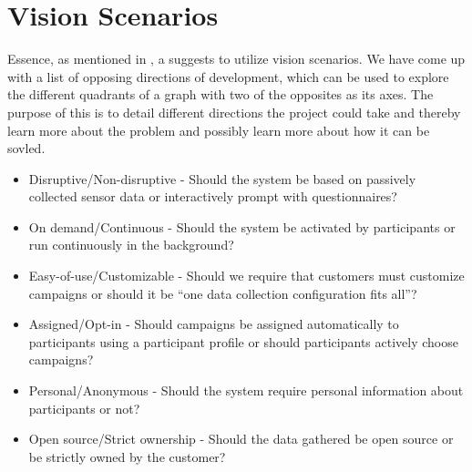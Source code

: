 \section{Vision Scenarios}
\label{sec:vision_scenarios}
Essence, as mentioned in , a suggests to utilize vision scenarios. We have come up with a list of opposing directions of development, which can be used to explore the different quadrants of a graph with two of the opposites as its axes. The purpose of this is to detail different directions the project could take and thereby learn more about the problem and possibly learn more about how it can be sovled. 


\begin{itemize}[itemsep=0.1em]
    \item Disruptive/Non-disruptive - Should the system be based on passively collected sensor data or interactively prompt with questionnaires? %
    \item On demand/Continuous - Should the system be activated by participants or run continuously in the background? %
    \item Easy-of-use/Customizable - Should we require that customers must customize campaigns or should it be ``one data collection configuration fits all''? %
    \item Assigned/Opt-in - Should campaigns be assigned automatically to participants using a participant profile or should participants actively choose campaigns? %
    \item Personal/Anonymous - Should the system require personal information about participants or not? %
    \item Open source/Strict ownership - Should the data gathered be open source or be strictly owned by the customer? %
\end{itemize}

